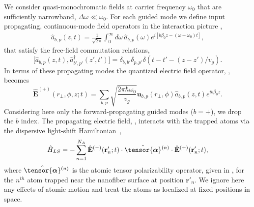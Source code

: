 \documentclass[preprint, aps,pra,onecolumn]{revtex4-1} %
\newcommand{\poltens}{\hat{\tensor{\boldsymbol{\alpha}}}}
\begin{document}
We consider quasi-monochromatic fields at carrier frequency $\omega_0$ that are sufficiently narrowband, $\Delta \omega \ll \omega_0$. 
For each guided mode we define input propagating, continuous-mode field operators in the interaction picture \cite{gardiner_input_1985, blow_continuum_1990, le_kien_correlations_2008},
	\begin{align}
		\hat{a}_{b,p}(z,t) =\frac{1}{\sqrt{2 \pi}}  \int_0^{\infty}\!\!\!\!\! d \omega \, \hat{a}_{b,p}(\omega) e^{i[b \beta_0 z- (\omega-\omega_0) t ]}, 
	\end{align}
that satisfy the free-field commutation relations,
	\begin{equation} \label{Eq::InputOutputCommutation}
		\big[\hat{a}_{b,p}(z,t),\hat{a}^\dag_{b',p'}(z',t')\big]=\delta_{b,b'}\delta_{p,p'}  \delta(t-t'-(z-z')/v_g).
	\end{equation}
In terms of these propagating modes the quantized electric field operator, , becomes
	\begin{equation} \label{Eq::PropagatingElectricField}
		\hat{\mathbf{E}}^{(+)}(r\!_\perp,\phi,z;t) = \sum_{b,p} \sqrt{ \frac{2 \pi \hbar \omega_0}{ v_g} } \mathbf{u}_{b,p}(r\!_\perp,\phi) \hat{a}_{b,p}(z,t)  e^{i b \beta_0 z}.
	\end{equation}	
Considering here only the forward-propagating guided modes ($b=+$), we drop the $b$ index.  
The propagating electric field, , interacts with the trapped atoms via the dispersive light-shift Hamiltonian~\cite{deutsch_quantum_2010,kien_dynamical_2013,baragiola_open_2014},
	\begin{equation} \label{Eq::LightShiftHam}
		\hat{H}_{LS} = - \sum_{n=1}^{N_A} \hat{\mathbf{E}}^{(-)}(\mathbf{r}'_n ; t ) \cdot \poltens {}^{(n)} \cdot \hat{\mathbf{E}}^{(+)}(\mathbf{r}'_n ;t ),
	\end{equation}
where $\poltens {}^{(n)}$ is the atomic tensor polarizability operator, given in , for the $n^{th}$ atom trapped near the nanofiber surface at position $\mathbf{r}'_n$.  We ignore here any effects of atomic motion and treat the atoms as localized at fixed positions in space.
\end{document}
